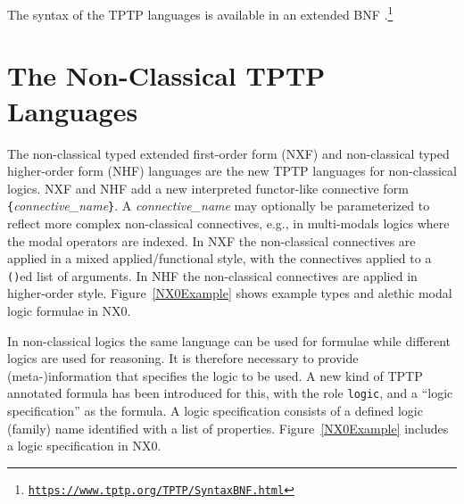 \documentclass[runningheads]{llncs}
\begin{document}
The syntax of the TPTP languages is available in an extended BNF \cite{VS06}.\footnote{%
\label{footnote:tptp}
\href{https://www.tptp.org/TPTP/SyntaxBNF.html}{\tt https://www.tptp.org/TPTP/SyntaxBNF.html}}

\section{The Non-Classical TPTP Languages}
\label{NTFLanguages}

The non-classical typed extended first-order form (NXF) and non-classical typed higher-order 
form (NHF) languages are the new TPTP languages for non-classical logics.
NXF and NHF add a new interpreted functor-like connective form
{\tt \verb|{|}{\em connective\_name}{\tt \verb|}|}.
A {\em connective\_name} may optionally be parameterized to reflect more complex 
non-classical connectives, e.g., in multi-modals logics where the modal operators are indexed.
In NXF the non-classical connectives are applied in a mixed applied/functional style, with the 
connectives applied to a {\tt ()}ed list of arguments.
In NHF the non-classical connectives are applied in higher-order style.
Figure~\ref{NX0Example} shows example types and alethic modal logic formulae in NX0.
%
%
%         

In non-classical logics the same language can be used for formulae while different logics are 
used for reasoning.
It is therefore necessary to provide \mbox{(meta-)}information that specifies the
logic to be used.
A new kind of TPTP annotated formula has been introduced for this, with the role \texttt{logic},
and a ``logic specification'' as the formula.
A logic specification consists of a defined logic (family) name identified with a list of 
properties.
Figure~\ref{NX0Example} includes a logic specification in NX0.
\end{document}
